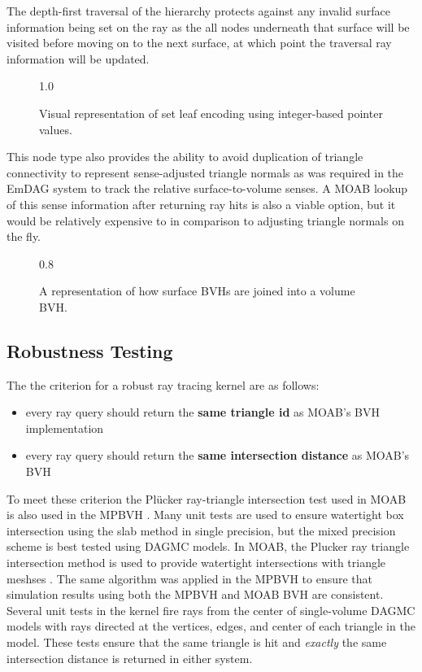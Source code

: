 The depth-first traversal of the hierarchy protects against
any invalid surface information being set on the ray as the all nodes underneath
that surface will be visited before moving on to the next surface, at which
point the traversal ray information will be updated.

\begin{figure}
  {1.0\textwidth}
  \caption{Visual representation of set leaf encoding using integer-based
    pointer values.}
  \label{fig:set_leaf_encoding}
\end{figure}

This node type also provides the ability to avoid duplication of triangle
connectivity to represent sense-adjusted triangle normals as was required in the
EmDAG system to track the relative surface-to-volume senses. A MOAB lookup of
this sense information after returning ray hits is also a viable option, but it
would be relatively expensive to in comparison to adjusting triangle normals on
the fly.

\begin{figure}[H]
  \centering
  {0.8\textwidth}
  \caption{A representation of how surface BVHs are joined into a volume BVH.}
  \label{fig:quad_tree_sets}
\end{figure}

\subsection{Robustness Testing}

The the criterion for a robust ray tracing kernel are as follows:

\begin{itemize}
  \item every ray query should return the \textbf{same triangle id} as MOAB's BVH
    implementation
  \item every ray query should return the \textbf{same intersection distance} as MOAB's BVH
\end{itemize}

To meet these criterion the Pl\"{u}cker ray-triangle intersection test used in
MOAB is also used in the MPBVH \cite{Platis_2003}. Many unit tests are used to
ensure watertight box intersection using the slab method \cite{Kay_1986} in
single precision, but the mixed precision scheme is best tested using DAGMC
models. In MOAB, the Plucker ray triangle intersection method is used to provide
watertight intersections with triangle meshses \cite{Platis_2003}. The same
algorithm was applied in the MPBVH to ensure that simulation results using both
the MPBVH and MOAB BVH are consistent. Several unit tests in the kernel fire
rays from the center of single-volume DAGMC models with rays directed at
the vertices, edges, and center of each triangle in the model. These tests
ensure that the same triangle is hit and \textit{exactly} the same intersection
distance is returned in either system.

